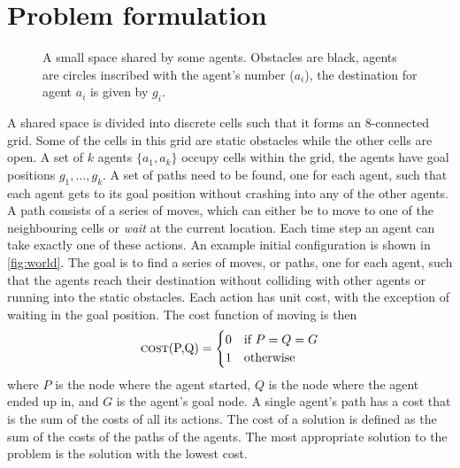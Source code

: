 \section{Problem formulation}\label{sec:problem}

\begin{figure}[t]
    \centering
    \def\svgscale{.7}
    
    \caption{A small space shared by some agents. Obstacles are black, agents
        are circles inscribed with the agent's number ($a_i$), the destination
        for
        agent $a_i$ is given by $g_i$.}
    \label{fig:world}
\end{figure}


A shared space is divided into discrete cells such that it forms an 8-connected
grid. Some of the cells in this grid are static obstacles while the other cells
are open. A set of $k$ agents $\{a_1, a_k\}$ occupy cells within the grid, the
agents have goal positions $g_1, \ldots, g_k$. A set of paths need to be found,
one for each agent, such that each agent gets to its goal position without
crashing into any of the other agents.
A path consists of a series of moves, which can either
be to move to one of the neighbouring cells or \emph{wait} at the current
location. Each time step an agent can take exactly one of these actions.
An example initial configuration is shown in \autoref{fig:world}. The goal is
to find a series of moves, or paths, one for each agent, such that the agents
reach their destination without colliding with other agents or running into the
static obstacles. Each action has unit cost, with the exception of waiting in 
the goal position. The cost function of moving is then
\[
\text{\textsc{cost}(P,Q)} =
\begin{cases}
    0 & \text{if } P = Q = G \\
    1 & \text{otherwise}
\end{cases}
\]
where $P$ is the node where the agent started, $Q$ is the node where the agent 
ended up in, and $G$ is the agent's goal node. A single agent's path has a cost 
that is the sum of the costs of all its actions. The cost of a solution is 
defined as the sum of the costs of the paths of the agents. The most 
appropriate solution to the problem is the solution with the lowest cost.

